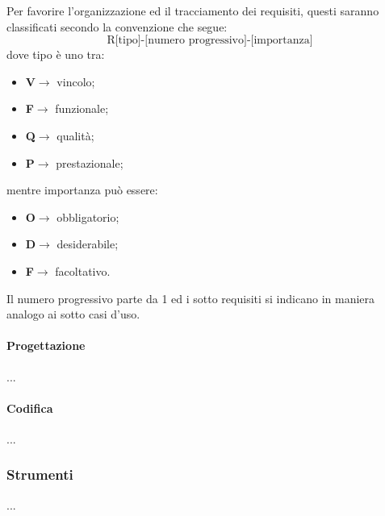                 Per favorire l'organizzazione ed il tracciamento dei requisiti, questi saranno classificati secondo la convenzione che segue:
                $$\text{R[tipo]-[numero progressivo]-[importanza]}$$
                dove tipo è uno tra:
                \begin{itemize}
                    \item \textbf{V}$\rightarrow$ vincolo;
                    \item \textbf{F}$\rightarrow$ funzionale;
                    \item \textbf{Q}$\rightarrow$ qualità;
                    \item \textbf{P}$\rightarrow$ prestazionale;
                \end{itemize}
                mentre importanza può essere:
                \begin{itemize}
                    \item \textbf{O}$\rightarrow$ obbligatorio;
                    \item \textbf{D}$\rightarrow$ desiderabile;
                    \item \textbf{F}$\rightarrow$ facoltativo.
                \end{itemize}
                Il numero progressivo parte da 1 ed i sotto requisiti si indicano in maniera analogo ai sotto casi d'uso.

        \paragraph{Progettazione}
            ...
        \paragraph{Codifica}
            ...
    \subsubsection{Strumenti}
        ...